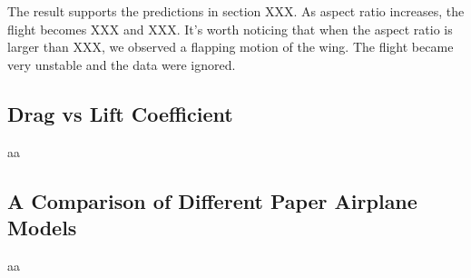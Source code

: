 The result supports the predictions in section XXX. As aspect ratio increases, the flight becomes XXX and XXX. It's worth noticing that when the aspect ratio is larger than XXX, we observed a flapping motion of the wing. The flight became very unstable and the data were ignored.

\subsection{Drag vs Lift Coefficient}
aa
\subsection{A Comparison of Different Paper Airplane Models}
aa